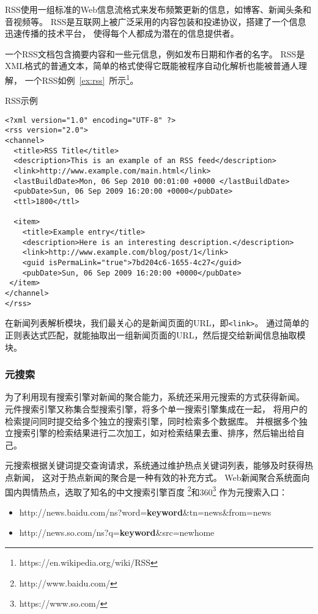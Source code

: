 RSS使用一组标准的Web信息流格式来发布频繁更新的信息，如博客、新闻头条和音视频等。
RSS是互联网上被广泛采用的内容包装和投递协议，搭建了一个信息迅速传播的技术平台，
使得每个人都成为潜在的信息提供者。

一个RSS文档包含摘要内容和一些元信息，例如发布日期和作者的名字。
RSS是XML格式的普通文本，简单的格式使得它既能被程序自动化解析也能被普通人理解，
一个RSS如例~\ref{ex:rss}~所示\footnote{https://en.wikipedia.org/wiki/RSS}。

\begin{example}
\label{ex:rss}
RSS示例
\end{example}
\begin{oframed}
\begin{verbatim}
<?xml version="1.0" encoding="UTF-8" ?>
<rss version="2.0">
<channel>
  <title>RSS Title</title>
  <description>This is an example of an RSS feed</description>
  <link>http://www.example.com/main.html</link>
  <lastBuildDate>Mon, 06 Sep 2010 00:01:00 +0000 </lastBuildDate>
  <pubDate>Sun, 06 Sep 2009 16:20:00 +0000</pubDate>
  <ttl>1800</ttl>

  <item>
    <title>Example entry</title>
    <description>Here is an interesting description.</description>
    <link>http://www.example.com/blog/post/1</link>
    <guid isPermaLink="true">7bd204c6-1655-4c27</guid>
    <pubDate>Sun, 06 Sep 2009 16:20:00 +0000</pubDate>
 </item>
</channel>
</rss>
\end{verbatim}
\end{oframed}

在新闻列表解析模块，我们最关心的是新闻页面的URL，即\texttt{<link>}。
通过简单的正则表达式匹配，就能抽取出一组新闻页面的URL，然后提交给新闻信息抽取模块。

\subsubsection{元搜索}
为了利用现有搜索引擎对新闻的聚合能力，系统还采用元搜索的方式获得新闻。
元件搜索引擎又称集合型搜索引擎，将多个单一搜索引擎集成在一起，
将用户的检索提问同时提交给多个独立的搜索引擎，同时检索多个数据库。
并根据多个独立搜索引擎的检索结果进行二次加工，如对检索结果去重、排序，然后输出给自己。

元搜索根据关键词提交查询请求，系统通过维护热点关键词列表，能够及时获得热点新闻，
这对于热点新闻的聚合是一种有效的补充方式。
Web新闻聚合系统面向国内舆情热点，选取了知名的中文搜索引擎百度
\footnote{http://www.baidu.com/}和360\footnote{https://www.so.com/}
作为元搜索入口：
\begin{itemize}
\item http://news.baidu.com/ns?word=\textbf{keyword}\&tn=news\&from=news
\item http://news.so.com/ns?q=\textbf{keyword}\&src=newhome
\end{itemize}

